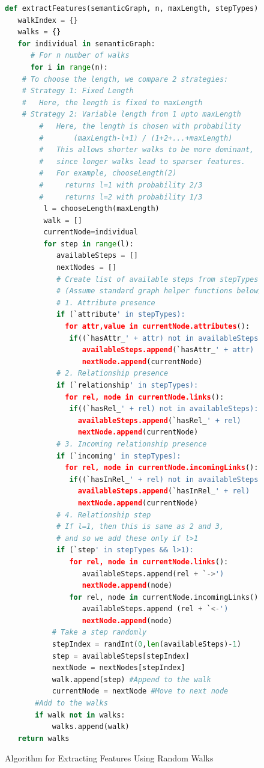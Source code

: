 \documentclass[runningheads,a4paper]{IEEEtran}
\begin{document}
\begin{figure}[t]
\begin{lstlisting}[language=Python,basicstyle=\scriptsize, frame=single]
def extractFeatures(semanticGraph, n, maxLength, stepTypes):
   walkIndex = {}
   walks = {}
   for individual in semanticGraph:
      # For n number of walks
      for i in range(n):
	# To choose the length, we compare 2 strategies:
	# Strategy 1: Fixed Length
	#   Here, the length is fixed to maxLength
	# Strategy 2: Variable length from 1 upto maxLength
        #   Here, the length is chosen with probability
        #       (maxLength-l+1) / (1+2+...+maxLength)
        #   This allows shorter walks to be more dominant,
        #   since longer walks lead to sparser features.
        #   For example, chooseLength(2) 
        #     returns l=1 with probability 2/3
        #     returns l=2 with probability 1/3
         l = chooseLength(maxLength)  
         walk = []
         currentNode=individual
         for step in range(l):
            availableSteps = []
            nextNodes = []
            # Create list of available steps from stepTypes
            # (Assume standard graph helper functions below)
            # 1. Attribute presence
            if (`attribute' in stepTypes):
              for attr,value in currentNode.attributes():
               if((`hasAttr_' + attr) not in availableSteps):
                  availableSteps.append(`hasAttr_' + attr)
                  nextNode.append(currentNode)
            # 2. Relationship presence
            if (`relationship' in stepTypes):
              for rel, node in currentNode.links():
               if((`hasRel_' + rel) not in availableSteps):
                 availableSteps.append(`hasRel_' + rel)
                 nextNode.append(currentNode)
            # 3. Incoming relationship presence
            if (`incoming' in stepTypes):
              for rel, node in currentNode.incomingLinks():
               if((`hasInRel_' + rel) not in availableSteps):
                 availableSteps.append(`hasInRel_' + rel)
                 nextNode.append(currentNode)
            # 4. Relationship step 
            # If l=1, then this is same as 2 and 3, 
            # and so we add these only if l>1
            if (`step' in stepTypes && l>1):
               for rel, node in currentNode.links():
                  availableSteps.append(rel + `->')
                  nextNode.append(node)
               for rel, node in currentNode.incomingLinks():
                  availableSteps.append (rel + `<-')
                  nextNode.append(node)
           # Take a step randomly
           stepIndex = randInt(0,len(availableSteps)-1)
           step = availableSteps[stepIndex]
           nextNode = nextNodes[stepIndex] 
           walk.append(step) #Append to the walk
           currentNode = nextNode #Move to next node
       #Add to the walks
       if walk not in walks:
           walks.append(walk) 
   return walks
\end{lstlisting}
\caption{Algorithm for Extracting Features Using Random Walks}
\label{extractFeatures}
\end{figure}
\end{document}
